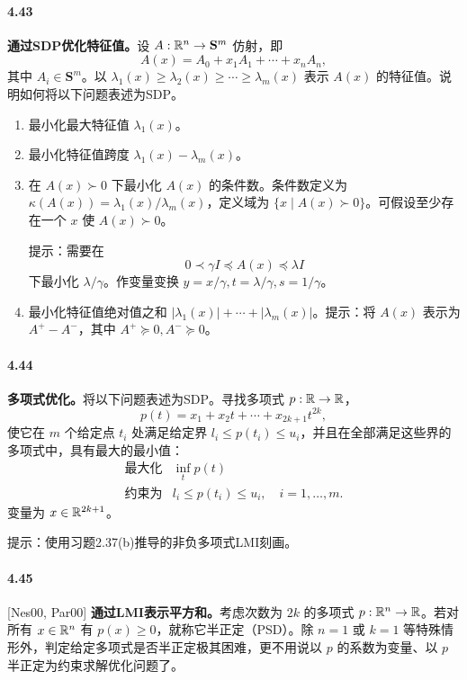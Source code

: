 \paragraph{4.43}\textbf{通过SDP优化特征值。}设 $A:\mathbb R^n\to\mathbf S^m$ 仿射，即
\[
A(x)=A_0+x_1A_1+\cdots+x_nA_n,
\]
其中 $A_i\in\mathbf S^m$。以 $\lambda_1(x)\ge\lambda_2(x)\ge\cdots\ge\lambda_m(x)$ 表示 $A(x)$ 的特征值。说明如何将以下问题表述为SDP。
\begin{enumerate}[label=(\alph*)]
\item 最小化最大特征值 $\lambda_1(x)$。
\item 最小化特征值跨度 $\lambda_1(x)-\lambda_m(x)$。
\item 在 $A(x)\succ0$ 下最小化 $A(x)$ 的条件数。条件数定义为 $\kappa(A(x))=\lambda_1(x)/\lambda_m(x)$，定义域为 $\{x\mid A(x)\succ0\}$。可假设至少存在一个 $x$ 使 $A(x)\succ0$。

提示：需要在
\[
0\prec\gamma I\preceq A(x)\preceq\lambda I
\]
下最小化 $\lambda/\gamma$。作变量变换 $y=x/\gamma,t=\lambda/\gamma,s=1/\gamma$。
\item 最小化特征值绝对值之和 $|\lambda_1(x)|+\cdots+|\lambda_m(x)|$。提示：将 $A(x)$ 表示为 $A^+-A^-$，其中 $A^+\succeq0,A^-\succeq0$。
\end{enumerate}

\paragraph{4.44}\textbf{多项式优化。}将以下问题表述为SDP。寻找多项式 $p:\mathbb R\to\mathbb R$，
\[
p(t)=x_1+x_2t+\cdots+x_{2k+1}t^{2k},
\]
使它在 $m$ 个给定点 $t_i$ 处满足给定界 $l_i\le p(t_i)\le u_i$，并且在全部满足这些界的多项式中，具有最大的最小值：
\[
\begin{array}{ll}\text{最大化}&\inf_t p(t)\\\text{约束为}&l_i\le p(t_i)\le u_i,\quad i=1,\ldots,m.\end{array}
\]
变量为 $x\in\mathbb R^{2k+1}$。

提示：使用习题2.37(b)推导的非负多项式LMI刻画。

\paragraph{4.45}[Nes00, Par00] \textbf{通过LMI表示平方和。}考虑次数为 $2k$ 的多项式 $p:\mathbb R^n\to\mathbb R$。若对所有 $x\in\mathbb R^n$ 有 $p(x)\ge0$，就称它半正定（PSD）。除 $n=1$ 或 $k=1$ 等特殊情形外，判定给定多项式是否半正定极其困难，更不用说以 $p$ 的系数为变量、以 $p$ 半正定为约束求解优化问题了。

